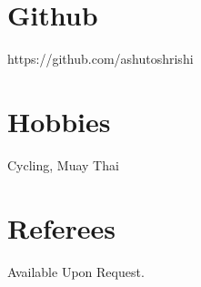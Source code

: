 \documentclass[a4paper,overlapped]{res}
\begin{document}
\begin{resume}
  \section{Github} 
  https://github.com/ashutoshrishi 
  \section{Hobbies}
  Cycling, Muay Thai
  
  \section{Referees}
  Available Upon Request.
  
  
\end{resume}
\end{document}
